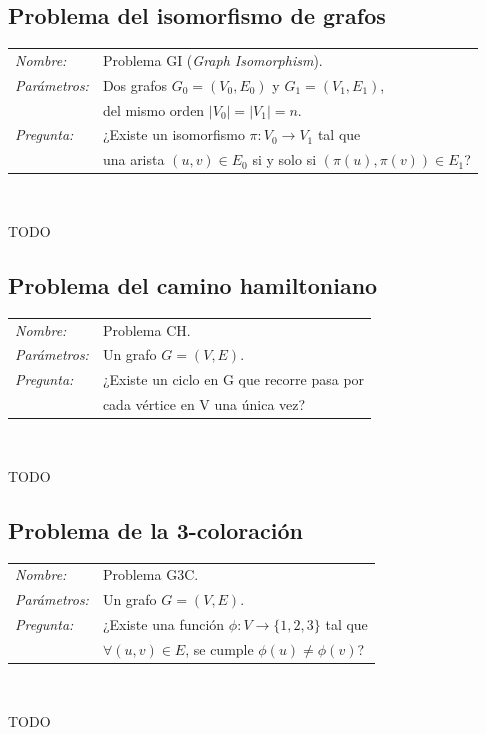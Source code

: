 \subsection{Problema del isomorfismo de grafos}

\hfil

\begin{tabular}{|ll}
	\textit{Nombre:} & Problema GI (\textit{Graph Isomorphism}). \\
	\textit{Parámetros:} & Dos grafos $G_0 = (V_0, E_0)$ y $G_1 = (V_1, E_1)$, \\ & del mismo orden $\mid V_0 \mid = \mid V_1 \mid = n$. \\
	\textit{Pregunta:} & ¿Existe un isomorfismo $\pi : V_0 \rightarrow V_1$ tal que \\ & una arista $(u,v)\in E_0$ si y solo si $(\pi (u),\pi (v)) \in E_1$? \\
\end{tabular}
\\

\hfil

TODO

\subsection{Problema del camino hamiltoniano}

\hfil

\begin{tabular}{|ll}
	\textit{Nombre:} & Problema CH. \\
	\textit{Parámetros:} &Un grafo $G=(V,E)$. \\
	\textit{Pregunta:} & ¿Existe un ciclo en G que recorre pasa por\\& cada vértice en V una única vez? \\
\end{tabular}
\\

\hfil

TODO

\subsection{Problema de la 3-coloración}

\hfil

\begin{tabular}{|ll}
	\textit{Nombre:} & Problema G3C. \\
	\textit{Parámetros:} &Un grafo $G=(V,E)$. \\
	\textit{Pregunta:} & ¿Existe una función $\phi : V \to \{1,2,3\}$ tal que \\ & $\forall (u,v)\in E$, se cumple $\phi(u)\neq \phi(v)$? \\
\end{tabular}
\\

\hfil

TODO

